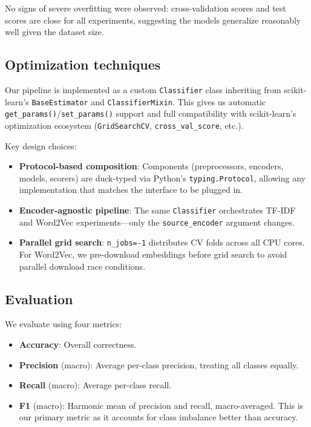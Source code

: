 \documentclass[12pt]{fphw}
\begin{document}
No signs of severe overfitting were observed: cross-validation scores and test scores are close for all experiments, suggesting the models generalize reasonably well given the dataset size.

\subsection{Optimization techniques}

Our pipeline is implemented as a custom \texttt{Classifier} class inheriting from scikit-learn's \texttt{BaseEstimator} and \texttt{ClassifierMixin}. This gives us automatic \texttt{get\_params()}/\texttt{set\_params()} support and full compatibility with scikit-learn's optimization ecosystem (\texttt{GridSearchCV}, \texttt{cross\_val\_score}, etc.).

Key design choices:
\begin{itemize}
	\item \textbf{Protocol-based composition}: Components (preprocessors, encoders, models, scorers) are duck-typed via Python's \texttt{typing.Protocol}, allowing any implementation that matches the interface to be plugged in.
	\item \textbf{Encoder-agnostic pipeline}: The same \texttt{Classifier} orchestrates TF-IDF and Word2Vec experiments---only the \texttt{source\_encoder} argument changes.
	\item \textbf{Parallel grid search}: \texttt{n\_jobs=-1} distributes CV folds across all CPU cores. For Word2Vec, we pre-download embeddings before grid search to avoid parallel download race conditions.
\end{itemize}

\subsection{Evaluation}

We evaluate using four metrics:
\begin{itemize}
	\item \textbf{Accuracy}: Overall correctness.
	\item \textbf{Precision} (macro): Average per-class precision, treating all classes equally.
	\item \textbf{Recall} (macro): Average per-class recall.
	\item \textbf{F1} (macro): Harmonic mean of precision and recall, macro-averaged. This is our primary metric as it accounts for class imbalance better than accuracy.
\end{itemize}
\end{document}
